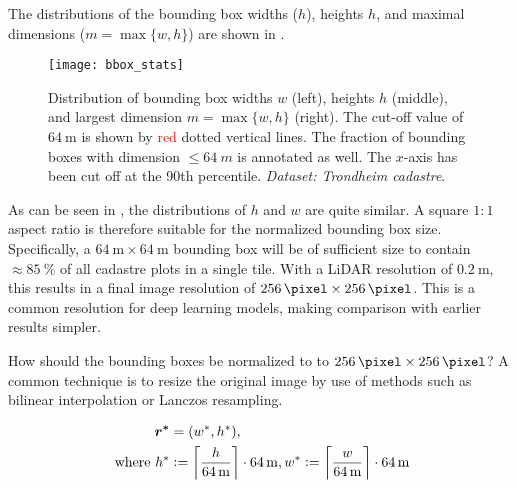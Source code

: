 The distributions of the bounding box widths ($h$), heights $h$, and maximal dimensions ($m = \max \{w, h\}$) are shown in .

\begin{figure}[htb]
  \texttt{[image: bbox\_stats]}
  \caption{
    Distribution of bounding box widths $w$ (left), heights $h$ (middle), and largest dimension $m = \max \{w, h\}$ (right).
    The cut-off value of $\SI{64}{\meter}$ is shown by \textcolor{red}{red} dotted vertical lines.
    The fraction of bounding boxes with dimension $\leq \SI{64}{m}$ is annotated as well.
    The $x$-axis has been cut off at the 90th percentile.
    \textit{Dataset: Trondheim cadastre}.
  }
  \label{fig:bbox-stats}
\end{figure}

As can be seen in , the distributions of $h$ and $w$ are quite similar.
A square $1:1$ aspect ratio is therefore suitable for the normalized bounding box size.
Specifically, a $\SI{64}{\meter} \times \SI{64}{\meter}$ bounding box will be of sufficient size to contain $\approx \SI{85}{\percent}$ of all cadastre plots in a single tile.
With a LiDAR resolution of $\SI{0.2}{\meter}$, this results in a final image resolution of $\SI{256}{\pixel} \times \SI{256}{\pixel}$.
This is a common resolution for deep learning models, making comparison with earlier results simpler.

How should the bounding boxes be normalized to to $\SI{256}{\pixel} \times \SI{256}{\pixel}$?
A common technique is to resize the original image by use of methods such as bilinear interpolation or Lanczos resampling.

\begin{align*}
  \boldsymbol{r^*} &= (w^*, h^*),
  \\
  \text{ where }
  h^* &:= \left\lceil \frac{h}{\SI{64}{\meter}} \right\rceil \cdot \SI{64}{\meter},
  w^* := \left\lceil \frac{w}{\SI{64}{\meter}} \right\rceil \cdot \SI{64}{\meter}
\end{align*}

\begin{figure}[H]
  \centering
  
\end{figure}
